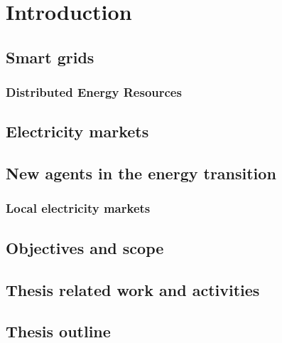\chapter{Introduction}
\label{chapterIntro}


\section{Smart grids}

\subsection{Distributed Energy Resources} \label{subsec:DG}

\section{Electricity markets}


\section{New agents in the energy transition}


\subsection{Local electricity markets}

\newpage 
\section{Objectives and scope}
	
\newpage 
\section{Thesis related work and activities}
	

\newpage 
\section{Thesis outline}
	


